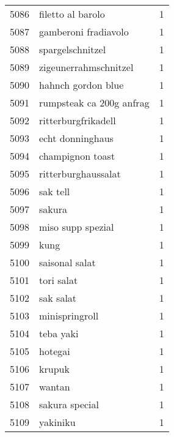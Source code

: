 \begin{tabular}{llr}
5086 &                                  filetto al barolo &      1 \\
5087 &                               gamberoni fradiavolo &      1 \\
5088 &                                   spargelschnitzel &      1 \\
5089 &                              zigeunerrahmschnitzel &      1 \\
5090 &                                 hahnch gordon blue &      1 \\
5091 &                           rumpsteak ca 200g anfrag &      1 \\
5092 &                                ritterburgfrikadell &      1 \\
5093 &                                   echt donninghaus &      1 \\
5094 &                                   champignon toast &      1 \\
5095 &                                ritterburghaussalat &      1 \\
5096 &                                           sak tell &      1 \\
5097 &                                             sakura &      1 \\
5098 &                                  miso supp spezial &      1 \\
5099 &                                               kung &      1 \\
5100 &                                     saisonal salat &      1 \\
5101 &                                         tori salat &      1 \\
5102 &                                          sak salat &      1 \\
5103 &                                     minispringroll &      1 \\
5104 &                                          teba yaki &      1 \\
5105 &                                            hotegai &      1 \\
5106 &                                             krupuk &      1 \\
5107 &                                             wantan &      1 \\
5108 &                                     sakura special &      1 \\
5109 &                                           yakiniku &      1 \\

\end{tabular}

